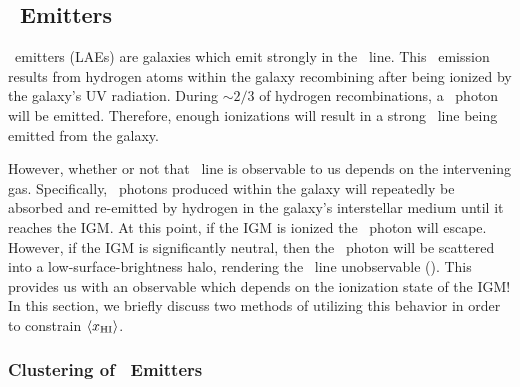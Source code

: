 \clearpage
\subsection{\lya\ Emitters}

\lya\ emitters (LAEs) are galaxies which emit strongly in the \lya\ line. This \lya\ emission results from hydrogen atoms within the galaxy recombining after being ionized by the galaxy's UV radiation. During $\sim2/3$ of hydrogen recombinations, a \lya\ photon will be emitted. Therefore,  enough ionizations will result in a strong \lya\ line being emitted from the galaxy. 


However, whether or not that \lya\ line is observable to us depends on the intervening gas. Specifically, \lya\ photons produced within the galaxy will repeatedly be absorbed and re-emitted by hydrogen in the galaxy's interstellar medium until it reaches the IGM. At this point, if the IGM is ionized the \lya\ photon will escape. However, if the IGM is significantly neutral, then the \lya\ photon will be scattered into a low-surface-brightness halo, rendering the \lya\ line unobservable (\citealt{finlator2012recent}). This provides us with an observable which depends on the ionization state of the IGM! In this section, we briefly discuss two methods of utilizing this behavior in order to constrain $\langle x_{\text{HI}}\rangle$.


\subsubsection{Clustering of \lya\ Emitters}

